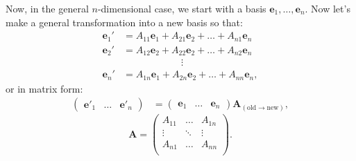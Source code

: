 \documentclass[../master.tex]{subfiles}
\begin{document}
	Now, in the general $n$-dimensional case, we start with a basis $\mathbf e_1, \dots, \mathbf e_n$. Now let's make a general transformation into a new basis so that:
	\begin{equation*}
		\begin{aligned}
			\mathbf e_1' &= A_{11} \mathbf e_1 + A_{21} \mathbf e_2 +\dots + A_{n1} \mathbf e_n\\
			\mathbf e_2' &= A_{12} \mathbf e_2 + A_{22} \mathbf e_2 +\dots + A_{n2} \mathbf e_n\\
			& \hspace{1in}\vdots\\
			\mathbf e_n' &= A_{1n} \mathbf e_1 + A_{2n} \mathbf e_2 +\dots + A_{nn} \mathbf e_n,
		\end{aligned}
	\end{equation*}
	or in matrix form:
	\begin{equation}\label{eq:CovariantTransform}
		\begin{aligned}
			\begin{pmatrix}
				\mathbf e'_1 & \dots & \mathbf e'_n
			\end{pmatrix} 
			&= 
			\begin{pmatrix}
				\mathbf e_1 & \dots & \mathbf e_n
			\end{pmatrix}
			\mathbf A_{(\mathrm{old}\rightarrow\mathrm{new})},
		\end{aligned}
	\end{equation}
	\begin{equation*}
		\mathbf A =
		\begin{pmatrix}
			A_{11} & \dots & A_{1n}\\
			\vdots & \ddots & \vdots\\
			A_{n1} & \dots & A_{nn}\\
		\end{pmatrix}.
	\end{equation*}
	
\end{document}
